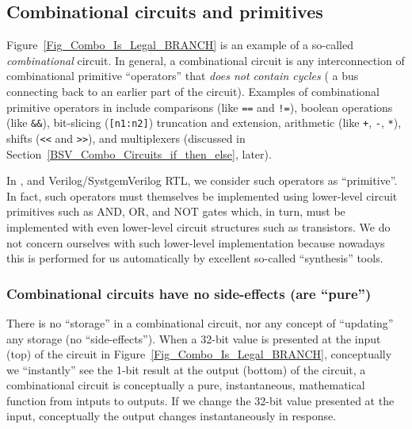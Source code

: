 
\subsection{Combinational circuits and primitives}


Figure~\ref{Fig_Combo_Is_Legal_BRANCH} is an example of a so-called
\emph{combinational} circuit.  In general, a combinational circuit is
any interconnection of combinational primitive ``operators'' that
\emph{does not contain cycles} ({\ie} a bus connecting back to an
earlier part of the circuit).  Examples of combinational primitive
operators in {\BSV} include comparisons (like \verb|==| and \verb|!=|),
boolean operations (like \verb|&&|), bit-slicing (\verb|[n1:n2]|)
truncation and extension, arithmetic (like \verb|+|, \verb|-|,
\verb|*|), shifts (\verb|<<| and \verb|>>|), and multiplexers
(discussed in Section~\ref{BSV_Combo_Circuits_if_then_else}, later).

In {\BSV}, and Verilog/SystgemVerilog RTL, we consider such operators as
``primitive''.  In fact, such operators must themselves be implemented
using lower-level circuit primitives such as AND, OR, and NOT gates
which, in turn, must be implemented with even lower-level circuit
structures such as transistors.  We do not concern ourselves with such
lower-level implementation because nowadays this is performed for us
automatically by excellent so-called ``synthesis'' tools.


\subsubsection{Combinational circuits have no side-effects (are ``pure'')}


There is no ``storage'' in a combinational circuit, nor any concept of
``updating'' any storage (no ``side-effects'').  When a 32-bit value
is presented at the input (top) of the circuit in
Figure~\ref{Fig_Combo_Is_Legal_BRANCH}, conceptually we
``instantly'' see the 1-bit result at the output (bottom) of the
circuit, {\ie} a combinational circuit is conceptually a pure,
instantaneous, mathematical function from intputs to outputs.  If we
change the 32-bit value presented at the input, conceptually the
output changes instantaneously in response.

